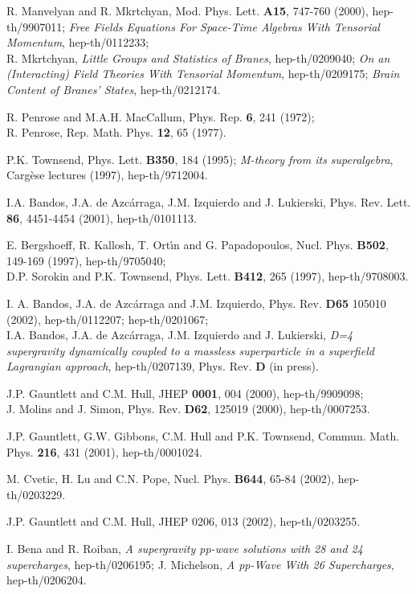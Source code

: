 \documentclass[a4paper,11pt]{article}
\begin{document}
{\begin{thebibliography}{99}
 R. Manvelyan and R. Mkrtchyan, 
Mod. Phys. Lett. {\bf A15}, 747-760 (2000), 
hep-th/9907011; 
{\sl Free Fields Equations For Space-Time Algebras With Tensorial Momentum}, 
hep-th/0112233; \\ 
  R. Mkrtchyan, {\sl Little Groups and Statistics of Branes}, 
hep-th/0209040; {\sl On an (Interacting) Field Theories With 
Tensorial Momentum}, hep-th/0209175; 
{\sl Brain Content of Branes' States}, 
 hep-th/0212174. 


R. Penrose and M.A.H. MacCallum, Phys. Rep. {\bf 6}, 241 (1972); \\
R. Penrose, Rep. Math. Phys. {\bf 12}, 65 (1977).

P.K. Townsend, Phys. Lett. {\bf B350}, 184 (1995); 
{\sl M-theory from its superalgebra},  Carg\`ese lectures
 (1997), hep-th/9712004. 

 I.A. Bandos, J.A. de Azc\'arraga, J.M. Izquierdo and J. Lukierski, 
Phys. Rev. Lett. {\bf 86}, 4451-4454 (2001),  hep-th/0101113. 

 E. Bergshoeff, R. Kallosh, T. Ort\'{\i}n and G. Papadopoulos, 
Nucl. Phys. {\bf B502}, 149-169 
(1997), hep-th/9705040; \\ 
 D.P. Sorokin and P.K. Townsend, 
 Phys. Lett. {\bf B412}, 265 (1997),  hep-th/9708003. 


I. A. Bandos, J.A. de Azc\'arraga and J.M. Izquierdo, 
Phys. Rev. {\bf D65} 105010 (2002),  hep-th/0112207;   
hep-th/0201067; \\ 
I.A. Bandos, J.A. de Azc\'arraga, J.M. Izquierdo and J. Lukierski, 
{\sl D=4 supergravity dynamically coupled to a massless superparticle in 
a superfield Lagrangian approach}, hep-th/0207139, Phys. Rev. {\bf D} 
(in press). 


J.P. Gauntlett and C.M. Hull, JHEP {\bf 0001}, 004 (2000), 
hep-th/9909098; \\ 
J. Molins and J. Simon, Phys. Rev. {\bf D62}, 125019 (2000),
hep-th/0007253. 

J.P. Gauntlett, G.W. Gibbons, C.M. Hull and P.K. Townsend, 
Commun. Math. Phys. {\bf 216}, 431 (2001), hep-th/0001024.

M. Cvetic, H. Lu and C.N. Pope, 
Nucl. Phys. {\bf B644}, 65-84 (2002), 
hep-th/0203229. 

J.P. Gauntlett and C.M. Hull, 
JHEP 0206, 013 (2002), 
hep-th/0203255. 

I. Bena and R. Roiban, {\sl A supergravity pp-wave solutions with 
28 and 24 supercharges}, hep-th/0206195; 
J. Michelson, {\sl A pp-Wave With 26 Supercharges}, 
hep-th/0206204.


\end{thebibliography}}
\end{document}
